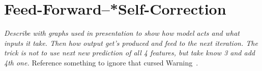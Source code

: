\section{Feed-Forward--*Self-Correction} \label{sec:feed}
\textit{Describe with graphs used in presentation to show how model acts and what inputs it take. Then how output get's produced and feed to the next iteration. The trick is not to use next new prediction of all 4 features, but take know 3 and add 4th one.}
Reference something to ignore that cursed Warning~\cite{secondtest}.